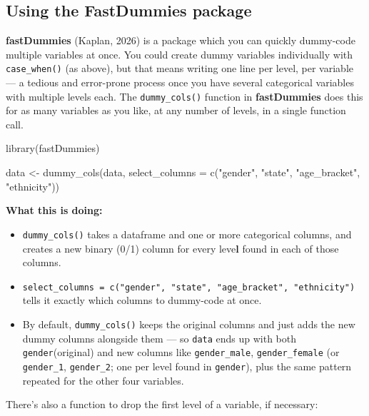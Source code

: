 \documentclass[
  letterpaper,
  DIV=11,
  numbers=noendperiod]{scrreprt}
\newenvironment{Shaded}{\begin{snugshade}}{\end{snugshade}}
\newcommand{\AttributeTok}[1]{\textcolor[rgb]{0.40,0.45,0.13}{#1}}
\newcommand{\FunctionTok}[1]{\textcolor[rgb]{0.28,0.35,0.67}{#1}}
\newcommand{\NormalTok}[1]{\textcolor[rgb]{0.00,0.23,0.31}{#1}}
\newcommand{\OtherTok}[1]{\textcolor[rgb]{0.00,0.23,0.31}{#1}}
\newcommand{\StringTok}[1]{\textcolor[rgb]{0.13,0.47,0.30}{#1}}
\begin{document}
\subsection{Using the FastDummies
package}\label{using-the-fastdummies-package}

\textbf{fastDummies} (Kaplan, 2026) is a package which you can quickly
dummy-code multiple variables at once. You could create dummy variables
individually with \texttt{case\_when()} (as above), but that means
writing one line per level, per variable --- a tedious and error-prone
process once you have several categorical variables with multiple levels
each. The \texttt{dummy\_cols()} function in \textbf{fastDummies} does
this for as many variables as you like, at any number of levels, in a
single function call.

\begin{Shaded}
\begin{Highlighting}[]
\FunctionTok{library}\NormalTok{(fastDummies)}

\NormalTok{data }\OtherTok{\textless{}{-}} \FunctionTok{dummy\_cols}\NormalTok{(data, }\AttributeTok{select\_columns =} \FunctionTok{c}\NormalTok{(}\StringTok{"gender"}\NormalTok{, }\StringTok{"state"}\NormalTok{, }\StringTok{"age\_bracket"}\NormalTok{, }\StringTok{"ethnicity"}\NormalTok{))}
\end{Highlighting}
\end{Shaded}

\textbf{What this is doing:}

\begin{itemize}
\item
  \texttt{dummy\_cols()} takes a dataframe and one or more categorical
  columns, and creates a new binary (0/1) column for every
  leve\textbf{l} found in each of those columns.
\item
  \texttt{select\_columns\ =\ c("gender",\ "state",\ "age\_bracket",\ "ethnicity")}
  tells it exactly which columns to dummy-code at once.
\item
  By default, \texttt{dummy\_cols()} keeps the original columns and just
  adds the new dummy columns alongside them --- so \texttt{data} ends up
  with both \texttt{gender}(original) and new columns like
  \texttt{gender\_male}, \texttt{gender\_female} (or \texttt{gender\_1},
  \texttt{gender\_2}; one per level found in \texttt{gender}), plus the
  same pattern repeated for the other four variables.
\end{itemize}

There's also a function to drop the first level of a variable, if
necessary:
\end{document}

